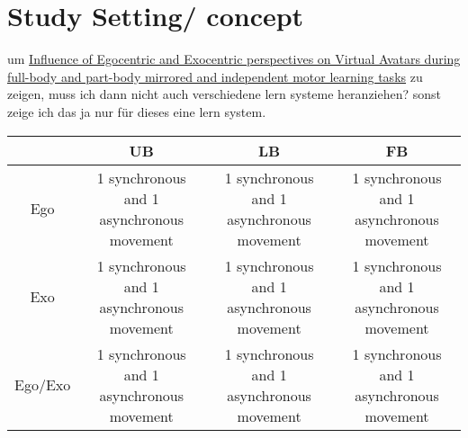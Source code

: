 \chapter{Study Setting/ concept}
um \underline{Influence of Egocentric and Exocentric perspectives on Virtual Avatars during full-body and part-body mirrored and independent motor learning tasks} zu zeigen, muss ich dann nicht auch verschiedene lern systeme heranziehen? sonst zeige ich das ja nur für dieses eine lern system.
\begin{center}
	\begin{tabular}{ | c | c | c | c | }
		\hline
		 & UB & LB & FB \\ \hline 
		Ego & \parbox{4cm}{1 synchronous and 1 asynchronous movement} & \parbox{4cm}{1 synchronous and 1 asynchronous movement} & \parbox{4cm}{1 synchronous and 1 asynchronous movement} \\ \hline 
		Exo & \parbox{4cm}{1 synchronous and 1 asynchronous movement} & \parbox{4cm}{1 synchronous and 1 asynchronous movement} & \parbox{4cm}{1 synchronous and 1 asynchronous movement} \\ \hline
		Ego/Exo & \parbox{4cm}{1 synchronous and 1 asynchronous movement} & \parbox{4cm}{1 synchronous and 1 asynchronous movement} & \parbox{4cm}{1 synchronous and 1 asynchronous movement} \\
		\hline
	\end{tabular}
\end{center}